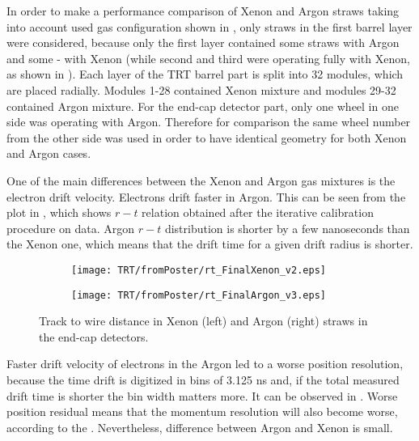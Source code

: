 In order to make a performance comparison of Xenon and Argon straws taking into account used gas configuration shown in ,
only straws in the first barrel layer were considered, because only the first layer contained some straws with Argon and some - with Xenon 
(while second and third were operating fully with Xenon, as shown in ).
Each layer of the TRT barrel part is split into 32 modules, which are placed radially. 
Modules 1-28 contained Xenon mixture and modules 29-32 contained Argon mixture.
For the end-cap detector part, only one wheel in one side was operating with Argon. Therefore for comparison the same wheel number from the other side was used in order
to have identical geometry for both Xenon and Argon cases.

One of the main differences between the Xenon and Argon gas mixtures is the electron drift velocity. Electrons drift faster in Argon. 
This can be seen from the plot in , 
which shows $r-t$ relation obtained after the iterative calibration procedure on data.
Argon $r-t$ distribution is shorter by a few nanoseconds than the Xenon one, which means that the drift time for a given drift radius is shorter.

\begin{figure}
\begin{subfigure}{.5\textwidth}
  \centering
  \texttt{[image: TRT/fromPoster/rt\_FinalXenon\_v2.eps]}
\end{subfigure}%
\begin{subfigure}{.5\textwidth}
  \centering
  \texttt{[image: TRT/fromPoster/rt\_FinalArgon\_v3.eps]}
\end{subfigure}

\caption{Track to wire distance in Xenon (left) and Argon (right) straws in the end-cap detectors.}
  \label{fig:RT_xenon_argon}
\end{figure}

Faster drift velocity of electrons in the Argon led to a worse position resolution,
because the time drift is digitized in bins of 3.125 ns and, if the total measured drift time is shorter the bin width matters more.
It can be observed in . Worse position residual means that the momentum resolution will also become worse, according to the
. Nevertheless, difference between Argon and Xenon is small.

